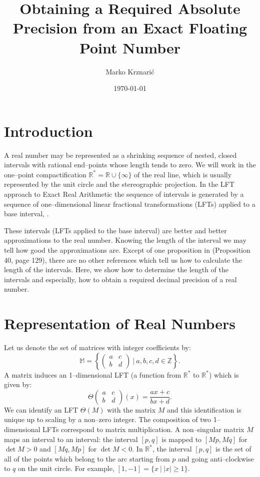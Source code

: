 \documentclass[11pt,a4paper]{article}
\begin{document}
\title{Obtaining a Required Absolute Precision from an Exact Floating Point
	Number}
\author{Marko Krznari\'{c}}
\date{\today} %
\maketitle


\section{Introduction}
A real number may be represented as a shrinking sequence of nested,
	closed intervals with rational end--points whose length tends to
	zero. We will work in the one--point compactification $\mathbb{R}^*
	= \mathbb{R} \cup \{ \infty \}$ of the real line, which is usually
	represented by the unit circle and the stereographic projection. In
	the LFT approach to Exact Real Arithmetic the sequence of intervals
	is generated by a sequence of one--dimensional linear fractional
	transformations (LFTs) applied to a base interval, \cite{vui90,
	niekor95, edapot97, pot98, hec99}.

These intervals (LFTs applied to the base interval) are better and
	better approximations to the real number. Knowing the length of the
	interval we may tell how good the approximations are. Except of
	one proposition in \cite{pot98} (Proposition 40, page 129), there
	are no other references which tell us how to calculate the length
	of the intervals. Here, we show how to determine the length of the
	intervals and especially, how to obtain a required decimal
	precision of a real number.


\section{Representation of Real Numbers}
Let us denote the set of matrices with integer coefficients by:
	\[ \mathbb{M} =
		\left\{ \left( \begin{array}{cc} a&c\\b&d \end{array}
        \right)\ |\ a,b,c,d \in \mathbb{Z} \right\}. \]
    A matrix induces an 1--dimensional LFT (a function from
	$\mathbb{R}^*$ to $\mathbb{R}^*$) which is given by:
    \[ \Theta \left( \begin{array}{cc} a&c\\b&d \end{array}
            \right)(x) = \displaystyle { \frac{ax+c}{bx+d} }. \]
    We can identify an LFT $\Theta(M)$ with the matrix $M$ and this
	identification is unique up to scaling by a non--zero
	integer. The composition of two 1--dimensional LFTs correspond
	to matrix multiplication. A non--singular matrix $M$ maps an
	interval to an interval: the interval $[p,q]$ is mapped to
	$[Mp, Mq]$ for $\det M > 0$ and $[Mq,Mp]$ for $\det M < 0$.
	In $\mathbb{R}^*$, the interval $[p,q]$ is the set of all of
	the points which belong to the arc starting from $p$ and going
	anti--clockwise to $q$ on the unit circle. For example, $[1,-1] =
	\{ x\ |\ |x| \ge 1 \}$.
\end{document}

